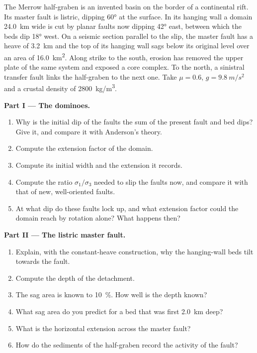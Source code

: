 \begin{problem}
\label{pb:b3:extension-strike-slip:1}
The Merrow half-graben is an invented basin on the border of a continental
rift. Its master fault is listric, dipping \ang{60} at the surface. In its
hanging wall a domain \qty{24.0}{km} wide is cut by planar faults now dipping
\ang{42} east, between which the beds dip \ang{18} west. On a seismic section
parallel to the slip, the master fault has a heave of \qty{3.2}{km} and the
top of its hanging wall sags below its original level over an area of
\qty{16.0}{km^2}. Along strike to the south, erosion has removed the upper
plate of the same system and exposed a core complex. To the north, a
sinistral transfer fault links the half-graben to the next one. Take $\mu =
0.6$, $g = \qty{9.8}{m/s^2}$ and a crustal density of
\qty{2800}{kg/m^3}.

\medskip\noindent\textbf{Part I --- The dominoes.}
\begin{enumerate}
  \item Why is the initial dip of the faults the sum of the present fault and
        bed dips? Give it, and compare it with Anderson's theory.
  \item Compute the extension factor of the domain.
  \item Compute its initial width and the extension it records.
  \item Compute the ratio $\sigma_1/\sigma_3$ needed to slip the faults now,
        and compare it with that of new, well-oriented faults.
  \item At what dip do these faults lock up, and what extension factor could
        the domain reach by rotation alone? What happens then?
\end{enumerate}

\medskip\noindent\textbf{Part II --- The listric master fault.}
\begin{enumerate}[resume]
  \item Explain, with the constant-heave construction, why the hanging-wall
        beds tilt towards the fault.
  \item Compute the depth of the detachment.
  \item The sag area is known to \qty{10}{\percent}. How well is the depth
        known?
  \item What sag area do you predict for a bed that was first \qty{2.0}{km}
        deep?
  \item What is the horizontal extension across the master fault?
  \item How do the sediments of the half-graben record the activity of the
        fault?
\end{enumerate}


\end{problem}
